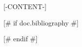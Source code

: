 \documentclass{article}
\begin{document}
[-CONTENT-]


[# if doc.bibliography #]

[# endif #]
\end{document}
